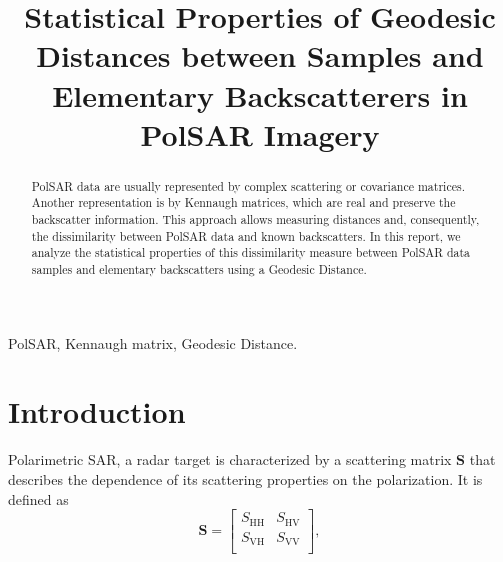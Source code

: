 \documentclass[conference]{IEEEtran}
\begin{document}
\title{Statistical Properties of Geodesic Distances between Samples and Elementary Backscatterers in PolSAR Imagery}

\author{
}

\maketitle

\begin{abstract}
PolSAR data are usually represented by complex scattering or covariance matrices.
Another representation is by Kennaugh matrices, which are real and preserve the backscatter information.
This approach allows measuring distances and, consequently, the dissimilarity between PolSAR data and known backscatters.
In this report, we analyze the statistical properties of this dissimilarity measure between PolSAR data samples and elementary backscatters using a Geodesic Distance.
\end{abstract}

\begin{IEEEkeywords}
PolSAR, Kennaugh matrix, Geodesic Distance.
\end{IEEEkeywords}

\section{Introduction}
 Polarimetric SAR, a radar target is characterized by a scattering matrix $\bm S$ that describes the dependence of its scattering properties on the polarization. 
It is defined as
\[\mathbf{S} = 
\begin{bmatrix}
S_{\text{HH}} & S_{\text{HV}}\\
S_{\text{VH}} & S_{\text{VV}}\\
\end{bmatrix}
,\]
\end{document}
